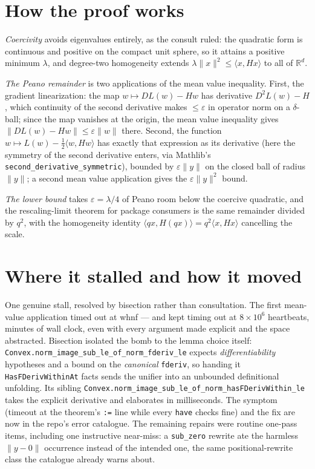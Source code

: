 \documentclass[11pt]{article}
\begin{document}
\section{How the proof works}

\emph{Coercivity} avoids eigenvalues entirely, as the consult ruled:
the quadratic form is continuous and positive on the compact unit
sphere, so it attains a positive minimum $\lambda$, and degree-two
homogeneity extends $\lambda\|x\|^2 \le \langle x, Hx\rangle$ to all
of $\mathbb{R}^d$.

\emph{The Peano remainder} is two applications of the mean value
inequality. First, the gradient linearization: the map
$w \mapsto DL(w) - Hw$ has derivative $D^2L(w) - H$, which continuity
of the second derivative makes $\le \varepsilon$ in operator norm on
a $\delta$-ball; since the map vanishes at the origin, the mean value
inequality gives $\|DL(w) - Hw\| \le \varepsilon\|w\|$ there. Second,
the function $w \mapsto L(w) - \tfrac12\langle w, Hw\rangle$ has
exactly that expression as its derivative (here the symmetry of the
second derivative enters, via Mathlib's
\texttt{second\_derivative\_symmetric}), bounded by
$\varepsilon\|y\|$ on the closed ball of radius $\|y\|$; a second
mean value application gives the $\varepsilon\|y\|^2$ bound.

\emph{The lower bound} takes $\varepsilon = \lambda/4$ of Peano room
below the coercive quadratic, and the rescaling-limit theorem for
package consumers is the same remainder divided by $q^2$, with the
homogeneity identity $\langle qx, H(qx)\rangle = q^2\langle x,
Hx\rangle$ cancelling the scale.

\section{Where it stalled and how it moved}

One genuine stall, resolved by bisection rather than consultation.
The first mean-value application timed out at whnf --- and kept
timing out at $8\times10^6$ heartbeats, minutes of wall clock, even
with every argument made explicit and the space abstracted. Bisection
isolated the bomb to the lemma choice itself:
\texttt{Convex.norm\_image\_sub\_le\_of\_norm\_fderiv\_le} expects
\emph{differentiability} hypotheses and a bound on the
\emph{canonical} \texttt{fderiv}, so handing it
\texttt{HasFDerivWithinAt} facts sends the unifier into an
unbounded definitional unfolding. Its sibling
\texttt{Convex.norm\_image\_sub\_le\_of\_norm\_hasFDerivWithin\_le}
takes the explicit derivative and elaborates in milliseconds. The
symptom (timeout at the theorem's \texttt{:=} line while every
\texttt{have} checks fine) and the fix are now in the repo's error
catalogue. The remaining repairs were routine one-pass items,
including one instructive near-miss: a \texttt{sub\_zero} rewrite ate
the harmless $\|y - 0\|$ occurrence instead of the intended one, the
same positional-rewrite class the catalogue already warns about.
\end{document}
